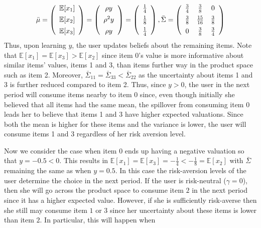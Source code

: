 \documentclass[format=acmsmall, review=false]{acmart}
\begin{document}
\[ \bar{\mu} =   \left (\begin{array}{c}
\mathbb{E}[x_1] \vspace{0.15cm} \\
\mathbb{E}[x_2] \vspace{0.15cm} \\
\mathbb{E}[x_3]
\end{array}  \right) =\left (\begin{array}{c}
\rho y  \vspace{0.15cm} \\
\rho^{2} y  \vspace{0.15cm} \\
 \rho y \\
\end{array} \right) =
\left (\begin{array}{c}
\frac{1}{4} \vspace{0.15cm} \\
\frac{1}{8}  \vspace{0.15cm} \\
\frac{1}{4}
\end{array}  \right), \bar{\Sigma} =  \left( \begin{array}{ccc}
\frac{3}{4} & \frac{3}{8} & 0 \vspace{0.15cm} \\
\frac{3}{8} & \frac{15}{16} & \frac{3}{8} \vspace{0.15cm}  \\
0 &\frac{3}{8} & \frac{3}{4}  \\
\end{array} \right)
\]
Thus, upon learning $y$, the user updates beliefs about the remaining items. Note that $\mathbb{E}[x_1] = \mathbb{E}[x_3] > \mathbb{E}[x_2]$ since item 0's value is more informative about similar items' values, items 1 and 3, than items further way in the product space such as item 2. Moreover, $\bar{\Sigma}_{11} = \bar{\Sigma}_{33} < \bar{\Sigma}_{22}$ as the uncertainty about items 1 and 3 is further reduced compared to item 2. Thus, since $y > 0$, the user in the next period will consume items nearby to item 0 since, even though initially she believed that all items had the same mean, the spillover from consuming item 0 leads her to believe that items 1 and 3 have higher expected valuations. Since both the mean is higher for these items and the variance is lower, the user will consume items 1 and 3 regardless of her risk aversion level.
\par 
Now we consider the case when item 0 ends up having a negative valuation so that $y = -0.5 < 0$. This results in $\mathbb{E}[x_1] = \mathbb{E}[x_3] = -\frac{1}{4} <  -\frac{1}{8} = \mathbb{E}[x_2]$ with $\bar{\Sigma}$ remaining the same as when $y = 0.5$. In this case the risk-aversion levels of the user determine the choice in the next period. If the user is risk-neutral ($\gamma = 0$), then she will go across the product space to consume item $2$ in the next period since it has a higher expected value. However, if she is sufficiently risk-averse then she still may consume item $1$ or $3$ since her uncertainty about these items is lower than item $2$. In particular, this will happen when 
\end{document}
